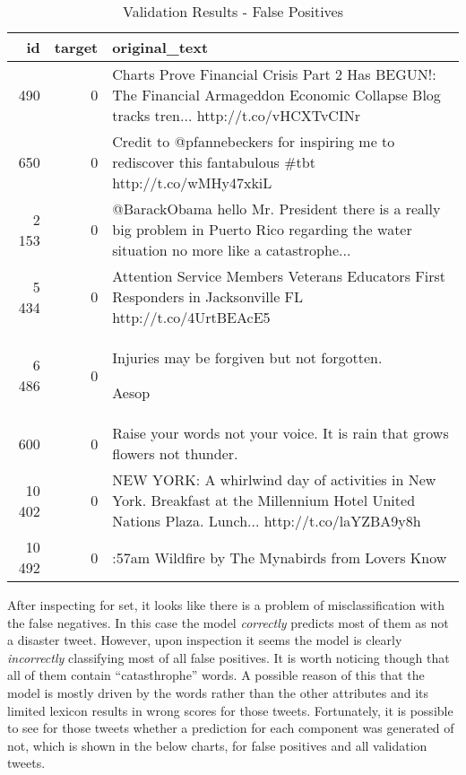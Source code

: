 \documentclass[11pt,]{article}
\begin{document}
\begin{table}[H]

\caption{\label{tab:validation_FP}Validation Results - False Positives}
\centering
\begin{tabular}[t]{rr>{\raggedright\arraybackslash}p{30em}}
\toprule
id & target & original\_text\\
\midrule
\rowcolor{gray!6}  490 & 0 & 9 Charts Prove Financial Crisis Part 2 Has BEGUN!: The Financial Armageddon Economic Collapse Blog tracks tren... http://t.co/vHCXTvCINr\\
650 & 0 & Credit to @pfannebeckers for inspiring me to rediscover this fantabulous \#tbt http://t.co/wMHy47xkiL\\
\rowcolor{gray!6}  2 153 & 0 & @BarackObama hello Mr. President there is a really big problem in Puerto Rico regarding the water situation no more like a catastrophe...\\
5 434 & 0 & Attention Service Members Veterans Educators First Responders in Jacksonville FL http://t.co/4UrtBEAcE5\\
6 486 & 0 & Injuries may be forgiven but not forgotten.

\rowcolor{gray!6}  Aesop\\
\addlinespace
9 600 & 0 & Raise your words not your voice. It is rain that grows flowers not thunder.\\
\rowcolor{gray!6}  10 402 & 0 & NEW YORK: A whirlwind day of activities in New York. Breakfast at the Millennium Hotel United Nations Plaza. Lunch... http://t.co/laYZBA9y8h\\
10 492 & 0 & 11:57am Wildfire by The Mynabirds from Lovers Know\\
\bottomrule
\end{tabular}
\end{table}

After inspecting for set, it looks like there is a problem of
misclassification with the false negatives. In this case the model
\emph{correctly} predicts most of them as not a disaster tweet. However,
upon inspection it seems the model is clearly \emph{incorrectly}
classifying most of all false positives. It is worth noticing though
that all of them contain ``catasthrophe'' words. A possible reason of
this that the model is mostly driven by the words rather than the other
attributes and its limited lexicon results in wrong scores for those
tweets. Fortunately, it is possible to see for those tweets whether a
prediction for each component was generated of not, which is shown in
the below charts, for false positives and all validation tweets.
\end{document}
